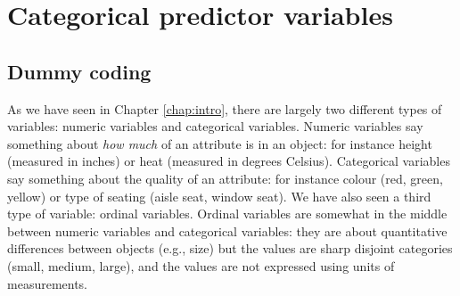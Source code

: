 \documentclass[]{book}\usepackage[]{graphicx}\usepackage[]{color}
\begin{document}
% 
% 
% 
% 
% 
% 
% 
% 
% 
% 
% 
% 
% 
% 


\chapter{Categorical predictor variables}\label{chap:categorical}



\section{Dummy coding}
As we have seen in Chapter \ref{chap:intro}, there are largely two different types of variables: numeric variables and categorical variables. Numeric variables say something about \textit{how much} of an attribute is in an object: for instance height (measured in inches) or heat (measured in degrees Celsius). Categorical variables say something about the quality of an attribute: for instance colour (red, green, yellow) or type of seating (aisle seat, window seat). We have also seen a third type of variable: ordinal variables. Ordinal variables are somewhat in the middle between numeric variables and categorical variables: they are about quantitative differences between objects (e.g., size) but the values are sharp disjoint categories (small, medium, large), and the values are not expressed using units of measurements.
\end{document}
